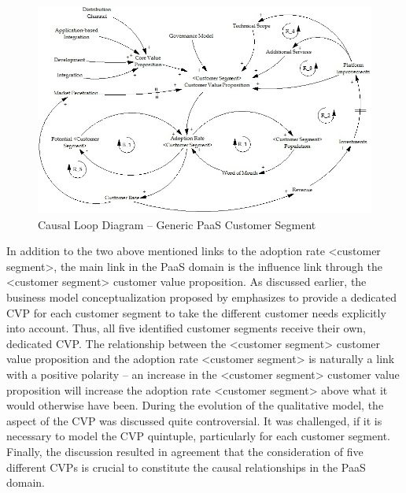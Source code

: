 \begin{figure}[tb]
	\centering
	\includegraphics[width=\textwidth]{gfx/cld_customerSegment}
	\caption{Causal Loop Diagram -- Generic PaaS Customer Segment}
	\label{fig:cld_cs}
\end{figure}

In addition to the two above mentioned links to the adoption rate <customer segment>, the main link in the \ac{PaaS} domain is the influence link through the <customer segment> customer value proposition. As discussed earlier, the business model conceptualization proposed by \citet{Johnson2008} emphasizes to provide a dedicated \ac{CVP} for each customer segment to take the different customer needs explicitly into account. Thus, all five identified customer segments receive their own, dedicated \ac{CVP}. The relationship between the <customer segment> customer value proposition and the adoption rate <customer segment> is naturally a link with a positive polarity -- an increase in the <customer segment> customer value proposition will increase the adoption rate <customer segment> above what it would otherwise have been. During the evolution of the qualitative model, the aspect of the \ac{CVP} was discussed quite controversial. It was challenged, if it is necessary to model the \ac{CVP} quintuple, particularly for each customer segment. Finally, the discussion resulted in agreement that the consideration of five different \acp{CVP} is crucial to constitute the causal relationships in the \ac{PaaS} domain.


